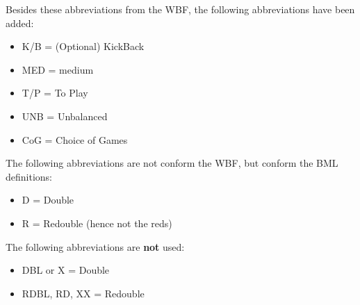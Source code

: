 \documentclass[a4paper]{article}
\begin{document}
\bigbreak
Besides these abbreviations from the WBF, the following abbreviations have been added:
\bigbreak
\begin{itemize}
\item K/B          = (Optional) KickBack

\item MED          = medium

\item T/P          = To Play

\item UNB          = Unbalanced

\item CoG          = Choice of Games

\end{itemize}
\bigbreak
The following abbreviations are not conform the WBF, but conform the BML definitions:
\bigbreak
\begin{itemize}
\item D            = Double

\item R            = Redouble (hence not the reds)

\end{itemize}
\bigbreak
The following abbreviations are \textbf{not} used:
\bigbreak
\begin{itemize}
\item DBL or X     = Double

\item RDBL, RD, XX = Redouble

\end{itemize}
\bigbreak
\end{document}
